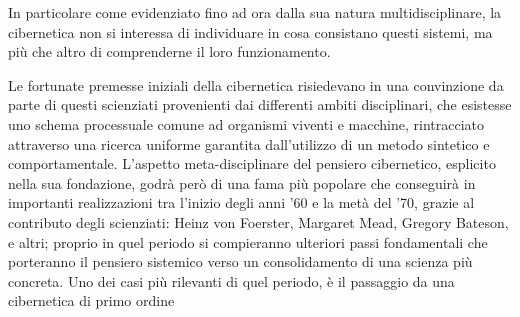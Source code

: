 In particolare come evidenziato fino ad ora dalla sua natura multidisciplinare,
la cibernetica non si interessa di individuare in
cosa consistano questi sistemi,
ma più che altro di comprenderne il loro funzionamento. 

Le fortunate premesse iniziali della cibernetica risiedevano in una convinzione
da parte di questi scienziati provenienti dai differenti ambiti disciplinari,
che esistesse uno schema processuale comune ad organismi viventi e macchine,
rintracciato attraverso una ricerca uniforme
garantita dall'utilizzo di un metodo
sintetico e
comportamentale. 
L'aspetto meta-disciplinare del pensiero cibernetico,
esplicito nella sua fondazione, godrà però di una fama più popolare 
che conseguirà in importanti realizzazioni 
tra l'inizio degli anni '60 e la metà del '70, 
grazie al contributo degli scienziati:
Heinz von Foerster, Margaret Mead, Gregory Bateson, e altri;
proprio in quel periodo si compieranno ulteriori passi fondamentali che porteranno
il pensiero sistemico verso un consolidamento di una scienza più concreta.
Uno dei casi più rilevanti di quel periodo, è il passaggio da una cibernetica di primo ordine

